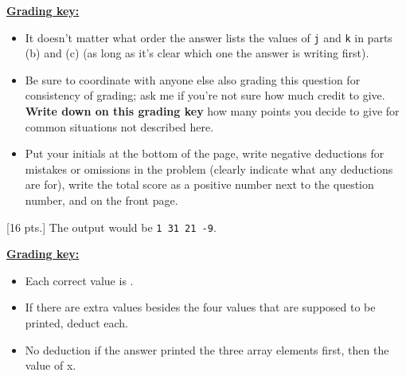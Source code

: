 \documentclass[11pt,fleqn]{article}
\begin{document}
\begin{enumerate}
\begin{info}{\textbf{\underline{Grading key:}}}
\begin{itemize}
              \item It doesn't matter what order the answer lists the values
                    of \texttt{j} and \texttt{k} in parts (b) and (c) (as
                    long as it's clear which one the answer is writing
                    first).

              \item Be sure to coordinate with anyone else also grading this
                    question for consistency of grading; ask me if you're
                    not sure how much credit to give.  \textbf{Write down on
                    this grading key} how many points you decide to give
                    for common situations not described here.

              \item Put your initials at the bottom of the page, write
                    negative deductions for mistakes or omissions in the
                    problem (clearly indicate what any deductions are for),
                    write the total score as a positive number next to the
                    question number, and on the front page.

            \end{itemize}

          \end{info}

          \pagebreak

    \begin{multicols}{2}


    \item {[16 pts.]} The output would be \texttt{1 31 21 -9}.

          \begin{info}{\textbf{\underline{Grading key:}}}

            \begin{itemize}

              \addtolength{\itemsep}{2mm}

              \item Each correct value is .

              \item If there are extra values besides the four values that
                    are supposed to be printed, deduct  each.

              \item No deduction if the answer printed the three array
                    elements first, then the value of x.


\end{itemize}
\end{info}
\end{multicols}
\end{enumerate}
\end{document}
